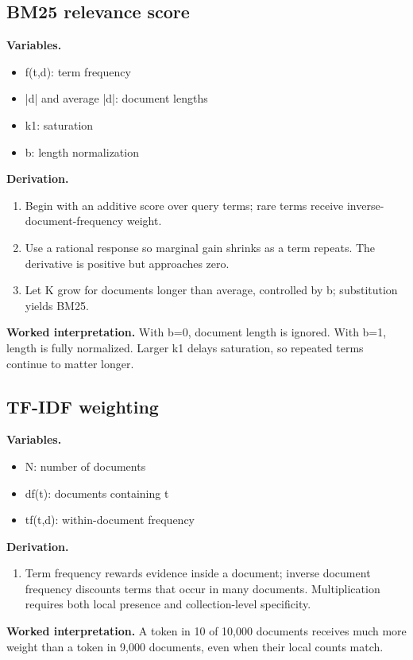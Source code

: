 \subsection{BM25 relevance score}
\textbf{Variables.}\begin{itemize}
\item f(t,d): term frequency
\item |d| and average |d|: document lengths
\item k1: saturation
\item b: length normalization
\end{itemize}
\textbf{Derivation.}\begin{derivation}\begin{enumerate}
\item Begin with an additive score over query terms; rare terms receive inverse-document-frequency weight.
\item Use a rational response so marginal gain shrinks as a term repeats. The derivative is positive but approaches zero.
\item Let K grow for documents longer than average, controlled by b; substitution yields BM25.
\end{enumerate}\end{derivation}
\textbf{Worked interpretation.} With b=0, document length is ignored. With b=1, length is fully normalized. Larger k1 delays saturation, so repeated terms continue to matter longer.
\subsection{TF-IDF weighting}
\textbf{Variables.}\begin{itemize}
\item N: number of documents
\item df(t): documents containing t
\item tf(t,d): within-document frequency
\end{itemize}
\textbf{Derivation.}\begin{derivation}\begin{enumerate}
\item Term frequency rewards evidence inside a document; inverse document frequency discounts terms that occur in many documents. Multiplication requires both local presence and collection-level specificity.
\end{enumerate}\end{derivation}
\textbf{Worked interpretation.} A token in 10 of 10,000 documents receives much more weight than a token in 9,000 documents, even when their local counts match.
